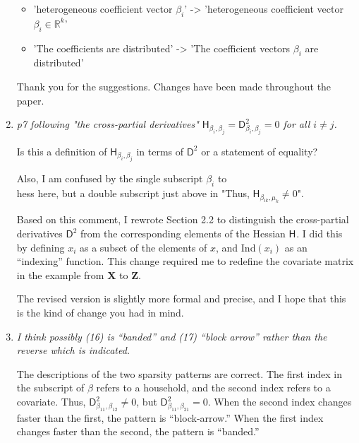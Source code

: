 \documentclass{article}
\newcommand{\parD}[3]{\mathsf{D}^{#1}_{#2}#3}
\newcommand{\hess}[2]{\mathsf{H}_{#1}#2}
\newcommand{\Mat}[1]{\mathbf{#1}}
\newcommand{\Real}[1]{\mathbb{R}^{#1}}
\newenvironment{revQuote}{\itshape}{\vspace{\baselineskip}}
\newenvironment{response}{\normalfont}{\vspace{\baselineskip}}
\begin{document}
\begin{enumerate}[align=left]
\begin{revQuote}
\begin{itemize}
  \item  'heterogeneous coefficient vector $\beta_i$' -> 'heterogeneous
coefficient vector $\beta_i \in \Real{k}$'

  \item 'The coefficients are distributed' -> 'The coefficient vectors
$\beta_i$ are distributed'
\end{itemize}
  \end{revQuote}

\begin{response}
  Thank you for the suggestions.  Changes have been made throughout the paper.
\end{response}


\item \begin{revQuote}
p7 following "the cross-partial derivatives"
$\hess{\beta_i,\beta_j}{}=\parD{2}{\beta_i, \beta_j}{}=0$ for all $i\neq
j$.  

  Is this a definition of $\hess{\beta_i,\beta_j}{}$ in terms of  $\parD{2}{}{}$
or a statement of equality?
  
  Also, I am confused by the single subscript $\beta_i$ to \\hess here, but a
double subscript just above in "Thus, $\hess{\beta_{ik},\mu_k}{}\neq 0$".
  \end{revQuote}

\begin{response}
  Based on this comment, I rewrote Section 2.2 to distinguish the
  cross-partial derivatives $\parD{2}{}{}$ from the corresponding
  elements of the Hessian $\hess{}{}$.  I did this by defining $x_i$ as
  a subset of the elements of $x$, and Ind$(x_i)$ as an 
  ``indexing'' function.  This change required me to redefine the
  covariate matrix in the example from $\Mat{X}$ to $\Mat{Z}$.

  The revised version is slightly more formal
  and precise, and I hope that this is the kind of change you had in
  mind.
\end{response}

\item \begin{revQuote}
 I think possibly (16) is ``banded'' and (17) ``block arrow'' rather than the
reverse which is indicated.
\end{revQuote}

\begin{response}
The descriptions of the two sparsity patterns are correct. The
first index in the subscript of $\beta$ refers to a household, and the
second index refers to a covariate. Thus,
$\parD{2}{\beta_{11},\beta_{12}}{}\neq 0$, but
$\parD{2}{\beta_{11},\beta_{21}}{}=0$.  When the second index changes
faster than the first, the pattern is ``block-arrow.''  When the first
index changes faster than the second, the pattern is ``banded.''
  

\end{response}
\end{enumerate}
\end{document}
